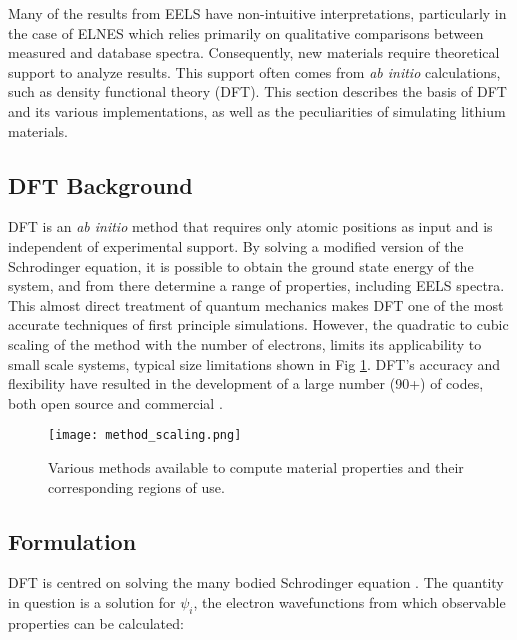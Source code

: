 

 


Many of the results from EELS have non-intuitive interpretations, particularly in the case of ELNES which relies primarily on qualitative comparisons between measured and database spectra.  Consequently, new materials require theoretical support to analyze results.  This support often comes from \textit{ab initio} calculations, such as density functional theory (DFT).  This section  describes the basis of DFT and its various implementations, as well as the peculiarities of simulating lithium materials.

\subsection{DFT Background}
DFT is an \textit{ab initio} method that requires only atomic positions as input and is independent of experimental support.  By solving a modified version of the Schrodinger equation, it is possible to obtain the ground state energy of the system, and from there determine a range of  properties, including EELS spectra. This almost direct treatment of quantum mechanics makes DFT one of the most accurate techniques of first principle simulations. However, the quadratic to cubic scaling of the method with the number of electrons, limits its applicability to small scale systems, typical size limitations shown in Fig \ref{scaling}.  DFT's accuracy and flexibility have resulted in the development of a large number (90+) of codes, both open source and commercial \cite{DFT_codes}.  

\begin{figure}
	\centering
	\texttt{[image: method\_scaling.png]}
	\caption{Various methods available to compute material properties and their corresponding regions of use. }
	\label{scaling}
\end{figure}


\subsection{Formulation}

DFT is centred  on solving the many bodied  Schrodinger equation \cite{sholl_density_2009}.  The quantity in question is a solution for $\psi_i$, the electron wavefunctions from which observable properties can be calculated:  


